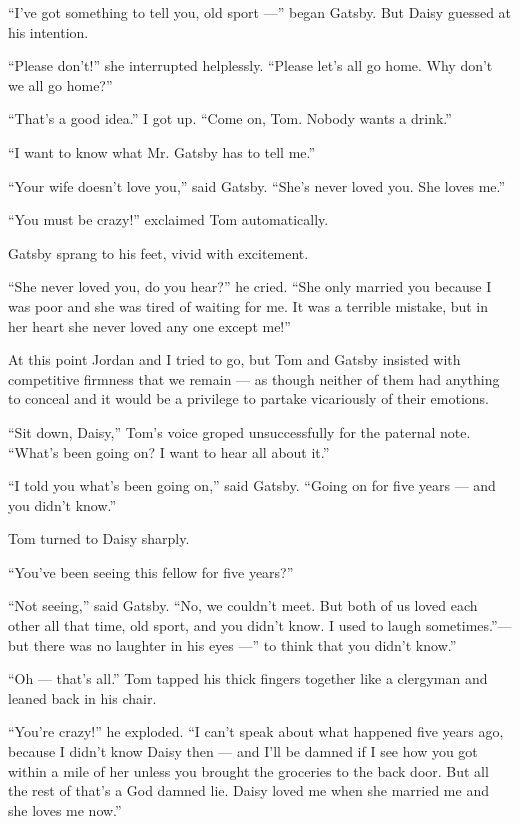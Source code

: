 \documentclass{znotebook}
\begin{document}
``I've got something to tell you, old sport ---'' began Gatsby. But Daisy guessed at his intention.

``Please don't!'' she interrupted helplessly. ``Please let's all go home. Why don't we all go home?''

``That's a good idea.'' I got up. ``Come on, Tom. Nobody wants a drink.''

``I want to know what Mr. Gatsby has to tell me.''

``Your wife doesn't love you,'' said Gatsby. ``She's never loved you. She loves me.''

``You must be crazy!'' exclaimed Tom automatically.

Gatsby sprang to his feet, vivid with excitement.

``She never loved you, do you hear?'' he cried. ``She only married you because I was poor and she was tired of waiting for me. It was a terrible mistake, but in her heart she never loved any one except me!''

At this point Jordan and I tried to go, but Tom and Gatsby insisted with competitive firmness that we remain ---{} as though neither of them had anything to conceal and it would be a privilege to partake vicariously of their emotions.

``Sit down, Daisy,'' Tom's voice groped unsuccessfully for the paternal note. ``What's been going on? I want to hear all about it.''

``I told you what's been going on,'' said Gatsby. ``Going on for five years ---{} and you didn't know.''

Tom turned to Daisy sharply.

``You've been seeing this fellow for five years?''

``Not seeing,'' said Gatsby. ``No, we couldn't meet. But both of us loved each other all that time, old sport, and you didn't know. I used to laugh sometimes.''---{} but there was no laughter in his eyes ---'' to think that you didn't know.''

``Oh ---{} that's all.'' Tom tapped his thick fingers together like a clergyman and leaned back in his chair.

``You're crazy!'' he exploded. ``I can't speak about what happened five years ago, because I didn't know Daisy then ---{} and I'll be damned if I see how you got within a mile of her unless you brought the groceries to the back door. But all the rest of that's a God damned lie. Daisy loved me when she married me and she loves me now.''
\end{document}
